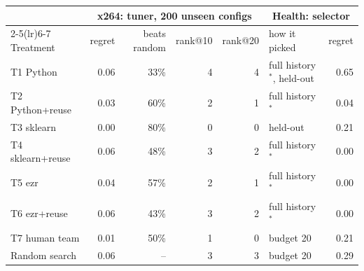 \begin{tabular}{lrrrrlr}
\toprule
 & \multicolumn{4}{c}{x264: tuner, 200 unseen configs} & \multicolumn{2}{c}{Health: selector} \\
\cmidrule(lr){2-5}\cmidrule(lr){6-7}
Treatment & regret & beats random & rank@10 & rank@20 & how it picked & regret \\
\midrule
T1 Python & 0.06 & 33\% & 4 & 4 & full history$^*$, held-out & 0.65 \\
T2 Python+reuse & 0.03 & 60\% & 2 & 1 & full history$^*$ & 0.04 \\
T3 sklearn & 0.00 & 80\% & 0 & 0 & held-out & 0.21 \\
T4 sklearn+reuse & 0.06 & 48\% & 3 & 2 & full history$^*$ & 0.00 \\
T5 ezr & 0.04 & 57\% & 2 & 1 & full history$^*$ & 0.00 \\
T6 ezr+reuse & 0.06 & 43\% & 3 & 2 & full history$^*$ & 0.00 \\
T7 human team & 0.01 & 50\% & 1 & 0 & budget 20 & 0.21 \\
\midrule Random search & 0.06 & -- & 3 & 3 & budget 20 & 0.29 \\
\bottomrule
\end{tabular}